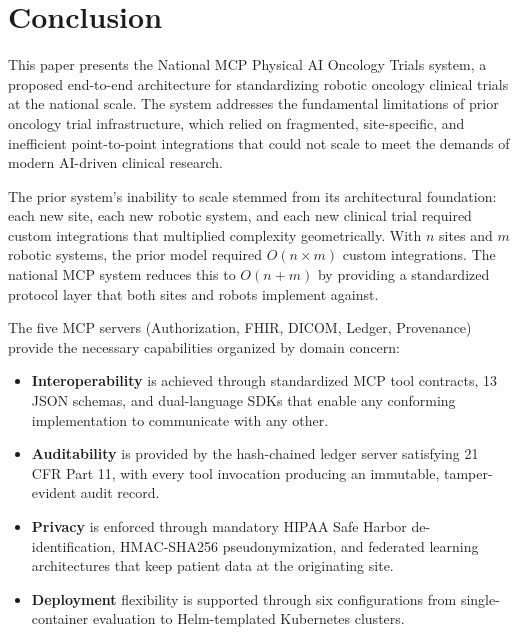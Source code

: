 \documentclass{article}
\begin{document}
\section{Conclusion}
\label{sec:conclusion}

This paper presents the National MCP Physical AI Oncology Trials system, a proposed end-to-end architecture for standardizing robotic oncology clinical trials at the national scale. The system addresses the fundamental limitations of prior oncology trial infrastructure, which relied on fragmented, site-specific, and inefficient point-to-point integrations that could not scale to meet the demands of modern AI-driven clinical research.

The prior system's inability to scale stemmed from its architectural foundation: each new site, each new robotic system, and each new clinical trial required custom integrations that multiplied complexity geometrically. With $n$ sites and $m$ robotic systems, the prior model required $O(n \times m)$ custom integrations. The national MCP system reduces this to $O(n + m)$ by providing a standardized protocol layer that both sites and robots implement against.

The five MCP servers (Authorization, FHIR, DICOM, Ledger, Provenance) provide the necessary capabilities organized by domain concern:

\begin{itemize}[leftmargin=*]
\item \textbf{Interoperability} is achieved through standardized MCP tool contracts, 13 JSON schemas, and dual-language SDKs that enable any conforming implementation to communicate with any other.
\item \textbf{Auditability} is provided by the hash-chained ledger server satisfying 21 CFR Part 11, with every tool invocation producing an immutable, tamper-evident audit record.
\item \textbf{Privacy} is enforced through mandatory HIPAA Safe Harbor de-identification, HMAC-SHA256 pseudonymization, and federated learning architectures that keep patient data at the originating site.
\item \textbf{Deployment} flexibility is supported through six configurations from single-container evaluation to Helm-templated Kubernetes clusters.
\end{itemize}
\end{document}
